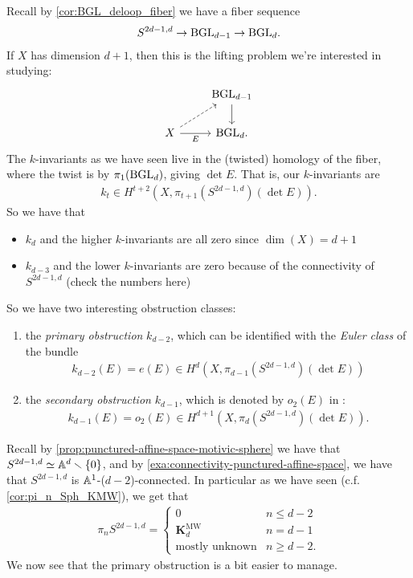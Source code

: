 \documentclass[11pt,openany]{book}
\providecommand{\KMW}{\mathbf{K}^\mathrm{MW}}
\begin{document}
Recall by \autoref{cor:BGL_deloop_fiber} we have a fiber sequence
\begin{align*}
    S^{2d-1,d} \to \mathrm{BGL}_{d-1} \to \mathrm{BGL}_d.
\end{align*}
If $X$ has dimension $d+1$, then this is the lifting problem we're interested in studying:
\[ \begin{tikzcd}
     & \BGL_{d-1}\dar\\
    X\rar["E" below]\ar[ur,dashed] & \BGL_d.
\end{tikzcd} \]
%
The $k$-invariants as we have seen live in the (twisted) homology of the fiber, where the twist is by $\pi_1(\mathrm{BGL}_d)$, giving $\det E$. That is, our $k$-invariants are
\begin{align*}
    k_t \in H^{t+2}(X,\pi_{t+1}(S^{2d-1,d})(\det E)).
\end{align*}
%
So we have that
\begin{itemize}
    \item $k_d$ and the higher $k$-invariants are all zero since $\dim(X) = d+1$
    \item $k_{d-3}$ and the lower $k$-invariants are zero because of the connectivity of $S^{2d-1,d}$ (\todo check the numbers here)
\end{itemize}
So we have two interesting obstruction classes:
\begin{enumerate}
    \item the \textit{primary obstruction} $k_{d-2}$, which can be identified with the \textit{Euler class} of the bundle
    \begin{align*}
        k_{d-2}(E) = e(E) \in H^d(X,\pi_{d-1}(S^{2d-1,d})(\det E))
    \end{align*}
    \item the \textit{secondary obstruction} $k_{d-1}$, which is denoted by $o_2(E)$ in \cite{ABH-Freudenthal}:
    \begin{align*}
        k_{d-1}(E) = o_2(E) \in H^{d+1}(X,\pi_{d}(S^{2d-1,d})(\det E)).
    \end{align*}
\end{enumerate}
Recall by \autoref{prop:punctured-affine-space-motivic-sphere} we have that $S^{2d-1,d}\simeq \mathbb{A}^d\smallsetminus\{0\}$, and by \autoref{exa:connectivity-punctured-affine-space}, we have that $S^{2d-1,d}$ is $\mathbb{A}^1$-($d-2$)-connected. In particular as we have seen (c.f. \autoref{cor:pi_n_Sph_KMW}), we get that
\begin{align*}
    \pi_n S^{2d-1,d} = \begin{cases} 0 & n\le d-2 \\ \KMW_d & n=d-1 \\ \text{mostly unknown} & n\ge d-2.\end{cases}
\end{align*}
We now see that the primary obstruction is a bit easier to manage.
\end{document}

